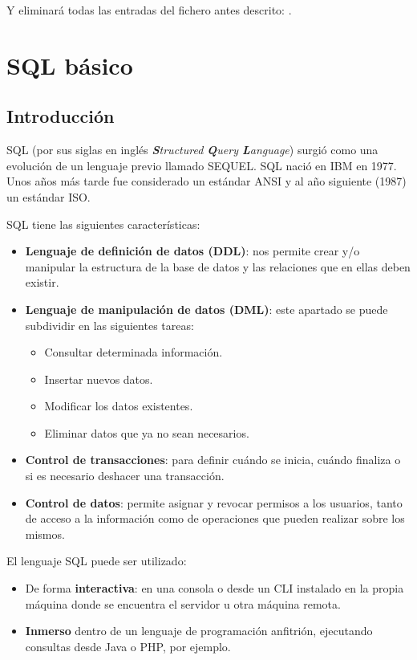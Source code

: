 Y eliminará todas las entradas del fichero antes descrito: .

\chapter{SQL básico}
\section{Introducción}
SQL (por sus siglas en inglés \textit{\textbf{S}tructured \textbf{Q}uery \textbf{L}anguage}) surgió como una evolución de un lenguaje previo llamado SEQUEL. SQL nació en IBM en 1977. Unos años más tarde fue considerado un estándar ANSI y al año siguiente (1987) un estándar ISO.

SQL tiene las siguientes características:

\begin{itemize}
    \item \textbf{Lenguaje de definición de datos (DDL)}: nos permite crear y/o manipular la estructura de la base de datos y las relaciones que en ellas deben existir.
    \item \textbf{Lenguaje de manipulación de datos (DML)}: este apartado se puede subdividir en las siguientes tareas:
    \begin{itemize}
        \item Consultar determinada información.
        \item Insertar nuevos datos.
        \item Modificar los datos existentes.
        \item Eliminar datos que ya no sean necesarios.
    \end{itemize}
    \item \textbf{Control de transacciones}: para definir cuándo se inicia, cuándo finaliza o si es necesario deshacer una transacción.
    \item \textbf{Control de datos}: permite asignar y revocar permisos a los usuarios, tanto de acceso a la información como de operaciones que pueden realizar sobre los mismos.
\end{itemize}

El lenguaje SQL puede ser utilizado:

\begin{itemize}
    \item De forma \textbf{interactiva}: en una consola o desde un CLI instalado en la propia máquina donde se encuentra el servidor u otra máquina remota.
    \item \textbf{Inmerso} dentro de un lenguaje de programación anfitrión, ejecutando consultas desde Java o PHP, por ejemplo.
\end{itemize}

